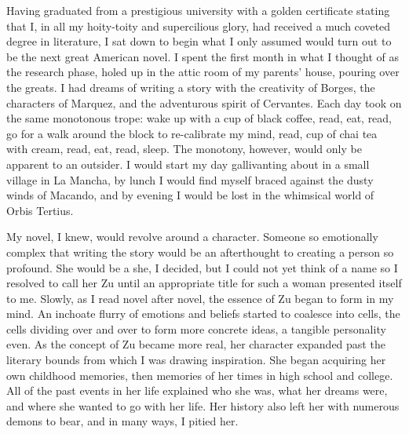 Having graduated from a prestigious university with a golden certificate stating that I, in all my hoity-toity and supercilious glory, had received a much coveted degree in literature, I sat down to begin what I only assumed would turn out to be the next great American novel. I spent the first month in what I thought of as the research phase, holed up in the attic room of my parents’ house, pouring over the greats.  I had dreams of writing a story with the creativity of Borges, the characters of Marquez, and the adventurous spirit of Cervantes. Each day took on the same monotonous trope: wake up with a cup of black coffee, read, eat, read, go for a walk around the block to re-calibrate my mind, read, cup of chai tea with cream, read, eat, read, sleep. The monotony, however, would only be apparent to an outsider. I would start my day gallivanting about in a small village in La Mancha, by lunch I would find myself braced against the dusty winds of Macando, and by evening I would be lost in the whimsical world of Orbis Tertius.

My novel, I knew, would revolve around a character. Someone so emotionally complex that writing the story would be an afterthought to creating a person so profound. She would be a she, I decided, but I could not yet think of a name so I resolved to call her Zu until an appropriate title for such a woman presented itself to me. Slowly, as I read novel after novel, the essence of Zu began to form in my mind. An inchoate flurry of emotions and beliefs started to coalesce into cells, the cells dividing over and over to form more concrete ideas, a tangible personality even. As the concept of Zu became more real, her character expanded past the literary bounds from which I was drawing inspiration. She began acquiring her own childhood memories, then memories of her times in high school and college. All of the past events in her life explained who she was, what her dreams were, and where she wanted to go with her life. Her history also left her with numerous demons to bear, and in many ways, I pitied her.

